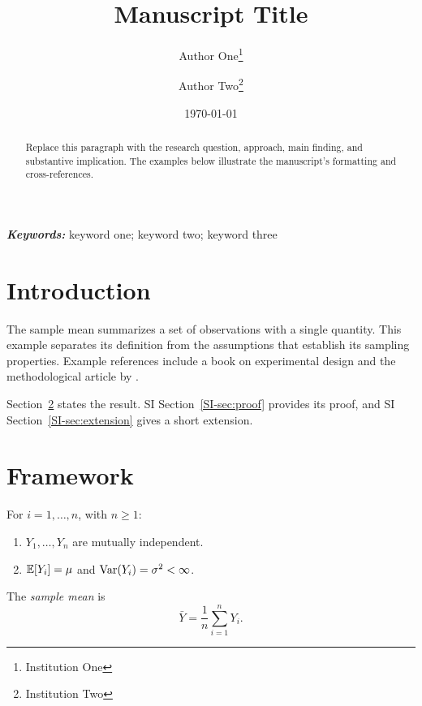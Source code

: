 \documentclass[12pt]{article}
\title{Manuscript Title}
\author{Author One\thanks{Institution One}\and Author Two\thanks{Institution Two}}
\date{\today}
\begin{document}
\maketitle

\begin{abstract}
\noindent Replace this paragraph with the research question, approach, main finding, and substantive implication. The examples below illustrate the manuscript's formatting and cross-references.
\end{abstract}

\noindent\textbf{\em Keywords:} keyword one; keyword two; keyword three

\clearpage

\section{Introduction}\label{sec:intro}

The sample mean summarizes a set of observations with a single quantity. This example separates its definition from the assumptions that establish its sampling properties. Example references include a book on experimental design \citep{fisher1935design} and the methodological article by \citet{athey2019generalized}.

Section~\ref{sec:framework} states the result. SI Section~\ref{SI-sec:proof} provides its proof, and SI Section~\ref{SI-sec:extension} gives a short extension.

\section{Framework}\label{sec:framework}

\begin{assumption}\label{ass:sampling}
For $i=1,\ldots,n$, with $n\geq 1$:
\begin{enumerate}[label=(\alph*)]
\item $Y_1,\ldots,Y_n$ are mutually independent.
\item $\mathbb{E}[Y_i]=\mu$ and $\operatorname{Var}(Y_i)=\sigma^2<\infty$.
\end{enumerate}
\end{assumption}

\begin{definition}\label{def:mean}
The {\em sample mean} is
\begin{equation}\label{eq:mean}
\bar Y=\frac{1}{n}\sum_{i=1}^{n}Y_i.
\end{equation}
\end{definition}
\end{document}

